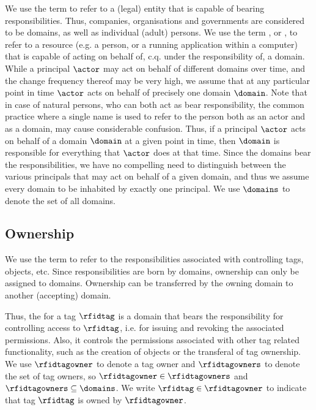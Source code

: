 We use the term  to refer to a (legal) entity that is capable of bearing responsibilities. 
Thus, companies, organisations and governments are considered to be domains, 
as well as individual (adult) persons. 
We use the term , or , to refer to a resource 
(e.g. a person, or a running application within a computer) 
that is capable of acting on behalf of, c.q. under the responsibility of, a domain.
While a principal $\actor$ may act on behalf of different domains over time, 
and the change frequency thereof may be very high, 
we assume that at any particular point in time $\actor$ acts on behalf of precisely one domain $\domain$.
Note that in case of natural persons, who can both act as bear responsibility, the common practice where a single name is used to refer to the person both as an actor and as a domain, may cause considerable confusion. 
Thus, if a principal $\actor$ acts on behalf of a domain $\domain$ at a given point in time,
 then $\domain$ is responsible for everything that $\actor$ does at that time.
Since the domains bear the responsibilities, we have no compelling need to distinguish 
between the various principals that may act on behalf of a given domain, and thus 
we assume every domain to be inhabited by exactly one principal. 
We use $\domains$ to denote the set of all domains. 


\subsection{Ownership}

We use the term  to refer to the responsibilities associated
with controlling tags, objects, etc.
Since responsibilities are born by domains, ownership can only be assigned to
domains. Ownership can be transferred by the owning domain to another
(accepting) domain.  

Thus, the  for a tag $\rfidtag$ is a domain that bears the
responsibility for controlling access to $\rfidtag$, i.e. for issuing and
revoking the associated permissions. Also, it controls the permissions
associated with other tag related functionality, such as the creation of
objects or the transferal of tag ownership.  We use $\rfidtagowner$ to denote a
tag owner and $\rfidtagowners$ to denote the set of tag owners, so
$\rfidtagowner \in \rfidtagowners$ and $\rfidtagowners \subseteq \domains$.  We
write $\rfidtag \in \rfidtagowner$ to indicate that tag $\rfidtag$ is owned by
$\rfidtagowner$.

